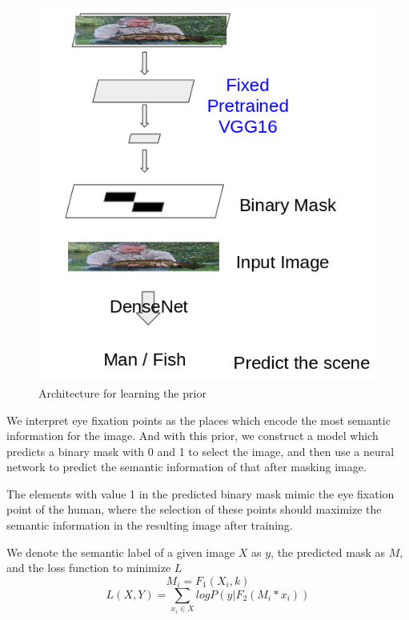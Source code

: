 \documentclass[10pt,twocolumn,letterpaper]{article}
\begin{document}
 \begin{figure}
 	\begin{center}
 		\includegraphics[width=\columnwidth]{figures/Prior.png}
 		
 	\end{center}
 	\caption{Architecture for learning the prior}
 	\label{fig:prior}
 \end{figure}
 
 We interpret eye fixation points as the places which encode the most semantic information for the image. And with this prior, we construct a model which predicts a binary mask with 0 and 1 to select the image, and then use a neural network to predict the semantic information of that after masking image. 
 
 The elements with value 1 in the predicted binary mask mimic the eye fixation point of the human, where the selection of these points should maximize the semantic information in the resulting image after training.
 
 We denote the semantic label of a given image $X$ as $y$, the predicted mask as $M$, and the loss function to minimize $L$
 $$M_i = F_1(X_i, k)$$
 $$L(X, Y) = \sum_{x_i \in X}{logP(y | F_2(M_i * x_i))}$$
 
\end{document}
